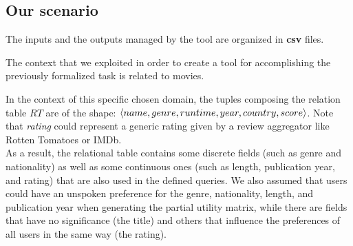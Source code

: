 \subsection{Our scenario}

The inputs and the outputs managed by the tool are organized in \textbf{csv} files.

The context that we exploited in order to create a tool for accomplishing the previously formalized task is related to movies. 

In the context of this specific chosen domain, the tuples composing the relation table $RT$ are of the shape: $\langle name, genre, runtime, year, \\country, score \rangle$.
Note that \textit{rating} could represent a generic rating given by a review aggregator like Rotten Tomatoes or IMDb.
\\

As a result, the relational table contains some discrete fields (such as genre and nationality) as well as some continuous ones (such as length, publication year, and rating) that are also used in the defined queries. We also assumed that users could have an unspoken preference for the genre, nationality, length, and publication year when generating the partial utility matrix, while there are fields that have no significance (the title) and others that influence the preferences of all users in the same way (the rating).